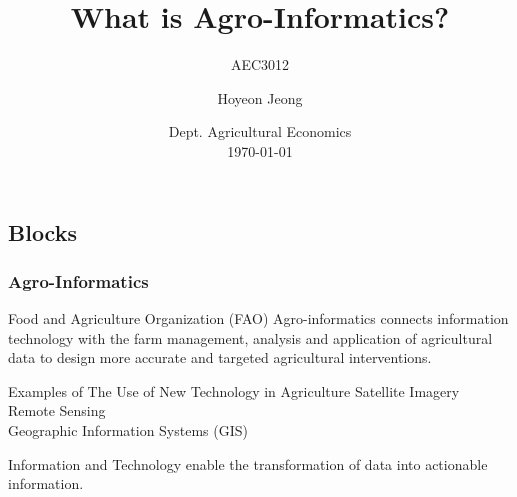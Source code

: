 \documentclass[
	11pt, %
]{beamer}
\title[What is Agro-Informatics?]{What is Agro-Informatics?} %
\subtitle{AEC3012} %
\author[Hoyeon Jeong]{Hoyeon Jeong} %
\institute[CNU]{Chonnam National University \\ \smallskip \textit{hjeong@jnu.ac.kr}} %
\date[\today]{Dept. Agricultural Economics \\ \today} %
\begin{document}

\begin{frame}
	\titlepage %
\end{frame}



\subsection{Blocks}

\begin{frame}
	\frametitle{Agro-Informatics}
	
	\begin{block}{Food and Agriculture Organization (FAO)}
		Agro-informatics connects information technology with the farm management, analysis and application of agricultural data to design more accurate and targeted agricultural interventions.
	\end{block}
	
	\begin{exampleblock}{Examples of The Use of New Technology in Agriculture}
		 Satellite Imagery \\ 
		 Remote Sensing \\ 
		 Geographic Information Systems (GIS) \\ 
	\end{exampleblock}
	
	\begin{block}{} %
		Information and Technology enable the transformation of data into actionable information.
	\end{block}
\end{frame}
\end{document}
